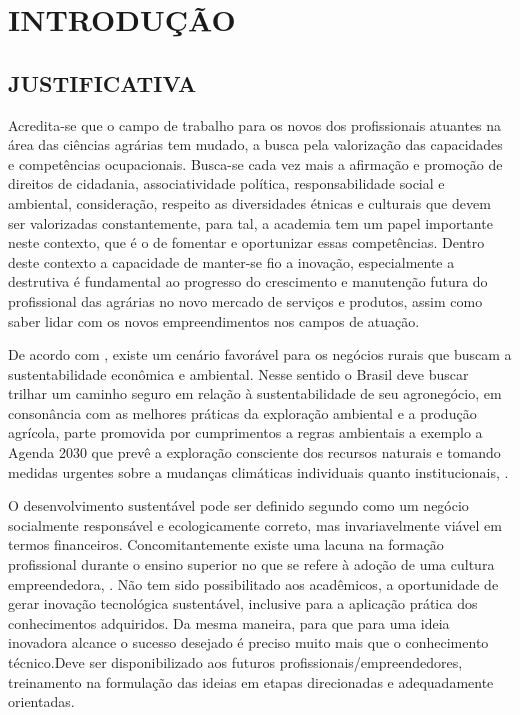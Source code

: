 \chapter{INTRODUÇÃO}

\section{JUSTIFICATIVA}

Acredita-se que o campo de trabalho para os novos dos profissionais atuantes na área das ciências agrárias tem mudado, a busca pela valorização das capacidades e competências ocupacionais. Busca-se cada vez mais a afirmação e promoção de direitos de cidadania, associatividade política, responsabilidade social e ambiental, consideração, respeito as diversidades étnicas e culturais que devem ser valorizadas constantemente, para tal, a academia  tem um papel importante neste contexto, que é  o de fomentar e oportunizar essas competências. Dentro deste contexto a capacidade de manter-se fio a inovação, especialmente a destrutiva é fundamental ao progresso do crescimento e manutenção futura do profissional das agrárias no novo mercado de serviços e produtos, assim como saber lidar com os novos empreendimentos nos campos de atuação.

De acordo com , existe um cenário favorável para os negócios rurais que buscam a sustentabilidade econômica e ambiental. Nesse sentido o Brasil deve buscar trilhar  um caminho seguro em relação à sustentabilidade de seu agronegócio, em consonância com as melhores práticas da exploração ambiental e a produção agrícola, parte promovida por cumprimentos a regras ambientais a exemplo a Agenda 2030 que prevê a exploração consciente dos recursos naturais e tomando medidas urgentes sobre a mudanças climáticas individuais quanto institucionais, \cite{filho_documentos_2017}.

O desenvolvimento sustentável pode ser definido segundo \cite{lara_ideologia_2017} como um negócio socialmente responsável e ecologicamente correto, mas invariavelmente viável em termos financeiros. Concomitantemente existe uma lacuna na formação profissional durante o ensino superior no que se refere à adoção de uma cultura empreendedora, \cite{lima_ser_2015}. Não tem sido possibilitado aos acadêmicos, a oportunidade de gerar inovação tecnológica sustentável, inclusive para a aplicação prática dos conhecimentos adquiridos. Da mesma maneira, para que para uma ideia inovadora alcance o sucesso desejado é preciso muito mais que o conhecimento técnico.Deve ser disponibilizado aos futuros profissionais/empreendedores, treinamento na formulação das ideias em etapas direcionadas e adequadamente orientadas.

